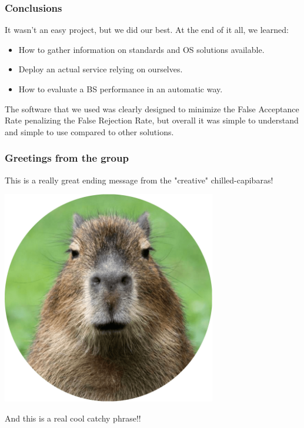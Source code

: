 \begin{frame} \frametitle{Conclusions}

	It wasn't an easy project, but we did our best. At the end of it all, we 
	learned:
	\vfill
	\begin{itemize}
		\item How to gather information on standards and OS solutions available.
		\item Deploy an actual service relying on ourselves.
		\item How to evaluate a BS performance in an automatic way.
	\end{itemize}
	\vfill
	The software that we used was clearly designed to minimize the False 
	Acceptance Rate penalizing the False Rejection Rate, but overall it 
	was simple to understand and simple to use compared to other solutions.

\end{frame}

\begin{frame} \frametitle{Greetings from the group}

	This is a really great ending message from the "creative" chilled-capibaras!
	\vfill
	\begin{center}
		\includegraphics[width=0.7\textwidth]{img/capibara}
	\end{center}
	\vfill
	\begin{center}
		And this is a real cool catchy phrase!!
	\end{center}

\end{frame}